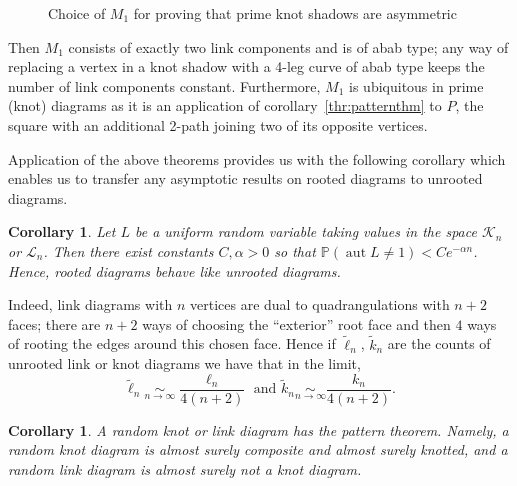 \documentclass[amsmath,longbibliography,secnumarabic,floatfix,amssymb,nofootinbib,nobibnotes,letterpaper,11pt,tightenlines,notitlepage,showkeys,showlabels]{amsart}%
\newcommand{\KnotDia}{\mathcal{K}}
\newcommand{\LinkDia}{\mathcal{L}}
\newcommand{\Prb}{\mathbb{P}}
\DeclareMathOperator{\Aut}{aut}
\newtheorem{corollary}[theorem]{Corollary}
\begin{document}
\begin{figure}[h!]
  \caption{Choice of $M_1$ for proving that prime knot shadows
    are asymmetric}
  \label{fig:primeknotasymm}
\end{figure}
Then $M_1$ consists of exactly two link components and is of abab
type; any way of replacing a vertex in a knot shadow with a 4-leg
curve of abab type keeps the number of link components
constant. Furthermore, $M_1$ is ubiquitous in prime (knot) diagrams as
it is an application of corollary~\ref{thr:patternthm} to $P$, the
square with an additional 2-path joining two of its opposite vertices.

Application of the above theorems provides us with the following corollary which enables us to
transfer any asymptotic results on rooted diagrams to unrooted diagrams.

\begin{corollary}
  Let $L$ be a uniform random variable taking values in the space $\KnotDia_n$ or $\LinkDia_n$. Then
  there exist constants $C, \alpha > 0$ so that $\Prb(\Aut L \ne 1) < Ce^{-\alpha n}$. Hence, rooted
  diagrams behave like unrooted diagrams.
\end{corollary}

Indeed, link diagrams with $n$ vertices are dual to quadrangulations with $n+2$ faces; there are
$n+2$ ways of choosing the ``exterior'' root face and then $4$ ways of rooting the edges around this
chosen face. Hence if $\tilde \ell_n$, $\tilde k_n$ are the counts of unrooted link or knot diagrams
we have that in the limit,
\[ \tilde\ell_n \underset{n\to\infty}{\sim} \frac{\ell_n}{4(n+2)} \text{ and } \tilde k_n
\underset{n\to\infty}{\sim} \frac{k_n}{4(n+2)}.\]

\begin{corollary}
  A random knot or link diagram has the pattern theorem. Namely, a random knot diagram is almost
  surely composite and almost surely knotted, and a random link diagram is almost surely not a knot
  diagram.
\end{corollary}
\end{document}
